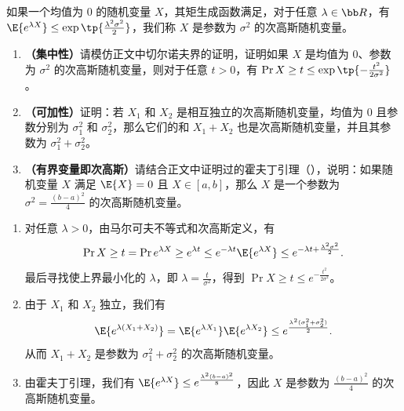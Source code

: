 \begin{exercise}
如果一个均值为 $0$ 的随机变量 $X$，其矩生成函数满足，对于任意 $\lambda \in \bb R$，有 $\E{e^{\lambda X}} \le \exp\tp{\frac{\lambda^2 \sigma^2}{2}}$，我们称 $X$ 是参数为 $\sigma^2$ 的次高斯随机变量。
\begin{enumerate}
    \item \textbf{（集中性）}请模仿正文中切尔诺夫界的证明，证明如果 $X$ 是均值为 $0$、参数为 $\sigma^2$ 的次高斯随机变量，则对于任意 $t>0$，有 $\Pr{X \ge t} \le \exp\tp{-\frac{t^2}{2\sigma^2}}$。
    \item \textbf{（可加性）}证明：若 $X_1$ 和 $X_2$ 是相互独立的次高斯随机变量，均值为 $0$ 且参数分别为 $\sigma_1^2$ 和 $\sigma_2^2$，那么它们的和 $X_1 + X_2$ 也是次高斯随机变量，并且其参数为 $\sigma_1^2 + \sigma_2^2$。
    \item \textbf{（有界变量即次高斯）}请结合正文中证明过的霍夫丁引理（），说明：如果随机变量 $X$ 满足 $\E{X} = 0$ 且 $X\in[a, b]$，那么 $X$ 是一个参数为 $\sigma^2 = \frac{(b-a)^2}{4}$ 的次高斯随机变量。
\end{enumerate}
\end{exercise}
\begin{solution}
    \begin{enumerate}
        \item 对任意 $\lambda > 0$，由马尔可夫不等式和次高斯定义，有
        \[
            \Pr{X \ge t} = \Pr{e^{\lambda X} \ge e^{\lambda t}} \le e^{-\lambda t} \E{e^{\lambda X}} \le e^{-\lambda t + \frac{\lambda^2 \sigma^2}{2}}.
        \]
        最后寻找使上界最小化的 $\lambda$，即 $\lambda = \frac{t}{\sigma^2}$，得到 $\Pr{X \ge t} \le e^{-\frac{t^2}{2\sigma^2}}$。
        \item 由于 $X_1$ 和 $X_2$ 独立，我们有
        \[
            \E{e^{\lambda(X_1 + X_2)}} = \E{e^{\lambda X_1}} \E{e^{\lambda X_2}} \le e^{\frac{\lambda^2 (\sigma_1^2 + \sigma_2^2)}{2}}.
        \]
        从而 $X_1 + X_2$ 是参数为 $\sigma_1^2 + \sigma_2^2$ 的次高斯随机变量。
        \item 由霍夫丁引理，我们有 $\E{e^{\lambda X}} \le e^{\frac{\lambda^2 (b-a)^2}{8}}$，因此 $X$ 是参数为 $\frac{(b-a)^2}{4}$ 的次高斯随机变量。
    \end{enumerate}
\end{solution}


